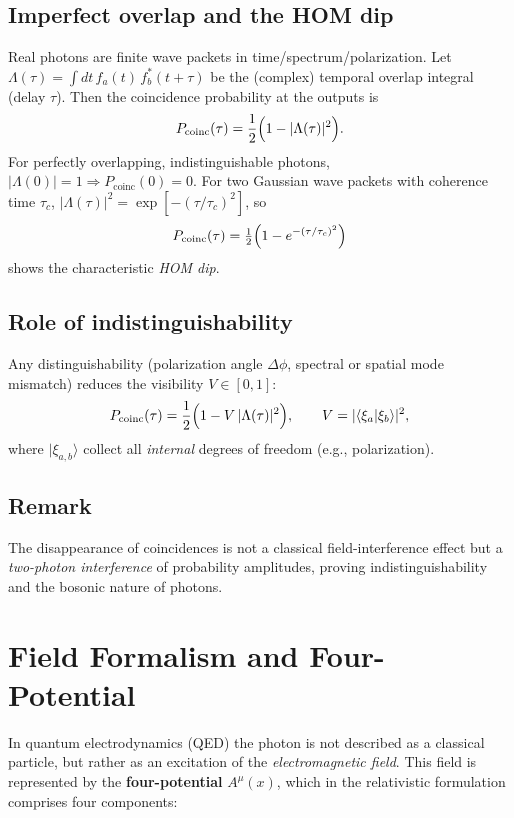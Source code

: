 \subsection*{Imperfect overlap and the HOM dip}
Real photons are finite wave packets in time/spectrum/polarization. Let
\(\Lambda(\tau)=\int\!dt\, f_a(t)\,f_b^*(t+\tau)\)
be the (complex) temporal overlap integral (delay \(\tau\)).
Then the coincidence probability at the outputs is
\[
P_{\text{coinc}}(\tau)=\frac{1}{2}\Bigl(1-|\Lambda(\tau)|^2\Bigr).
\]
For perfectly overlapping, indistinguishable photons, \(|\Lambda(0)|=1\Rightarrow P_{\text{coinc}}(0)=0\).
For two Gaussian wave packets with coherence time \(\tau_c\),
\(|\Lambda(\tau)|^2=\exp[-(\tau/\tau_c)^2]\),
so
\[
P_{\text{coinc}}(\tau)=\tfrac{1}{2}\Bigl(1-e^{-(\tau/\tau_c)^2}\Bigr)
\]
shows the characteristic \emph{HOM dip}.

\subsection*{Role of indistinguishability}
Any distinguishability (polarization angle \(\Delta\phi\), spectral or spatial mode mismatch) reduces the visibility \(V\in[0,1]\):
\[
P_{\text{coinc}}(\tau)=\frac{1}{2}\Bigl(1- V\,|\Lambda(\tau)|^2\Bigr),
\qquad
V=|\langle \xi_a|\xi_b\rangle|^2,
\]
where \(|\xi_{a,b}\rangle\) collect all \emph{internal} degrees of freedom (e.g., polarization).

\subsection*{Remark}
The disappearance of coincidences is not a classical field-interference effect but a \emph{two-photon interference} of probability amplitudes, proving indistinguishability and the bosonic nature of photons.
\section{Field Formalism and Four-Potential}
\label{anhangA:feldformalismus}
\label{anhangA:viererpotential} %

In quantum electrodynamics (QED) the photon is not described as a classical particle,
but rather as an excitation of the \emph{electromagnetic field}. 
This field is represented by the \textbf{four-potential} \( A^\mu(x) \),
which in the relativistic formulation comprises four components:

